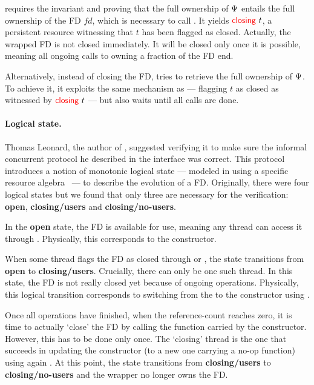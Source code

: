  requires the invariant and proving that the full ownership of $\Psi$ entails the full ownership of the FD $\mathit{fd}$, which is necessary to call .
It yields $\textcolor{red}{\textsf{\upshape closing}}\ t$, a persistent resource witnessing that $t$ has been flagged as closed.
Actually, the wrapped FD is not closed immediately.
It will be closed only once it is possible, meaning all ongoing calls to  owning a fraction of the FD end.

Alternatively, instead of closing the FD,  tries to retrieve the full ownership of $\Psi$.
To achieve it, it exploits the same mechanism as  --- flagging $t$ as closed as witnessed by $\textcolor{red}{\textsf{\upshape closing}}\ t$ --- but also waits until all  calls are done.

\paragraph{Logical state.}
Thomas Leonard, the author of , suggested verifying it to make sure the informal concurrent protocol he described in the \OCaml interface was correct.
This protocol introduces a notion of monotonic logical state --- modeled in \Iris using a specific resource algebra~\cite{DBLP:conf/cpp/TimanyB21} --- to describe the evolution of a FD.
Originally, there were four logical states but we found that only three are necessary for the verification: \textbf{open}, \textbf{closing/users} and \textbf{closing/no-users}.

In the \textbf{open} state, the FD is available for use, meaning any thread can access it through .
Physically, this corresponds to the  constructor.

When some thread flags the FD as closed through  or , the state transitions from \textbf{open} to \textbf{closing/users}.
Crucially, there can only be one such thread.
In this state, the FD is not really closed yet because of ongoing  operations.
Physically, this logical transition corresponds to switching from the  to the  constructor using .

Once all  operations have finished, when the reference-count reaches zero, it is time to actually `close' the FD by calling the function carried by the  constructor.
However, this has to be done only once.
The `closing' thread is the one that succeeds in updating the  constructor (to a new one carrying a no-op function) using again .
At this point, the state transitions from \textbf{closing/users} to \textbf{closing/no-users} and the wrapper no longer owns the FD.

